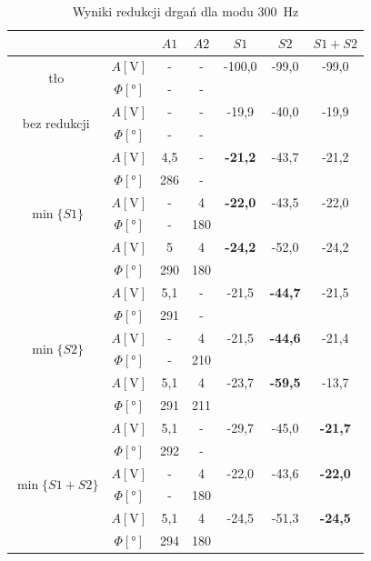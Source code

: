 \documentclass[polish,a4paper,11pt]{mwart}
\begin{document}
\begin{table}[!tbh]
  \centering
  \caption{Wyniki redukcji drgań dla modu \SI{300}{\hertz}}
  \label{tab:red2}
  \begin{tabular}{|c|c|c|c|c|c|c|}
    \cline{3-7}
    \multicolumn{2}{c|}{}&$A1$&$A2$&$S1$&$S2$&$S1+S2$\\\hline
    \multirow{2}{*}{tło}               &   $A [\si{\V}]$ & - & - & -100,0 & -99,0 & -99,0 \\\cline{2-7}
				       &$\Phi [\si{\degree}]$ & - & - & \multicolumn{3}{c}{}\\\hline
    \multirow{2}{*}{bez redukcji} &   $A [\si{\V}]$ & - & - & -19,9 & -40,0 & -19,9 \\\cline{2-7}
				       &$\Phi [\si{\degree}]$ & - & - & \multicolumn{3}{c}{}\\\hline
    \multirow{6}{*}{$\min\{S1\}$}      &   $A [\si{\V}]$ & 4,5 & - & \textbf{-21,2} & -43,7 & -21,2\\\cline{2-7}
				       &$\Phi [\si{\degree}]$ & 286 & - & \multicolumn{3}{c}{}\\\cline{2-7}
				       &   $A [\si{\V}]$ & - & 4 & \textbf{-22,0} & -43,5 & -22,0 \\\cline{2-7}
				       &$\Phi [\si{\degree}]$ & - & 180 & \multicolumn{3}{c}{}\\\cline{2-7}
				       &   $A [\si{\V}]$ & 5 & 4 & \textbf{-24,2} & -52,0 & -24,2 \\\cline{2-7}
				       &$\Phi [\si{\degree}]$ & 290 & 180 & \multicolumn{3}{c}{}\\\hline
    \multirow{6}{*}{$\min\{S2\}$}      &   $A [\si{\V}]$ & 5,1 & - & -21,5 & \textbf{-44,7} & -21,5 \\\cline{2-7}
				       &$\Phi [\si{\degree}]$ & 291 & - & \multicolumn{3}{c}{}\\\cline{2-7}
				       &   $A [\si{\V}]$ & - & 4 & -21,5 & \textbf{-44,6} & -21,4 \\\cline{2-7}
				       &$\Phi [\si{\degree}]$ & - & 210 & \multicolumn{3}{c}{}\\\cline{2-7}
				       &   $A [\si{\V}]$ & 5,1 & 4 & -23,7 & \textbf{-59,5} & -13,7\\\cline{2-7}
				       &$\Phi [\si{\degree}]$ & 291 & 211 & \multicolumn{3}{c}{}\\\hline
    \multirow{6}{*}{$\min\{S1+S2\}$}   &   $A [\si{\V}]$ & 5,1 & - & -29,7 & -45,0 & \textbf{-21,7}\\\cline{2-7}
				       &$\Phi [\si{\degree}]$ & 292 & - & \multicolumn{3}{c}{}\\\cline{2-7}
				       &   $A [\si{\V}]$ & - & 4 & -22,0 & -43,6 & \textbf{-22,0} \\\cline{2-7}
				       &$\Phi [\si{\degree}]$ & - & 180 & \multicolumn{3}{c}{}\\\cline{2-7}
				       &   $A [\si{\V}]$ & 5,1 & 4 & -24,5 & -51,3 & \textbf{-24,5} \\\cline{2-7}
				       &$\Phi [\si{\degree}]$ & 294 & 180 & \multicolumn{3}{c}{}\\\cline{1-4}
  \end{tabular}
\end{table}
\end{document}
